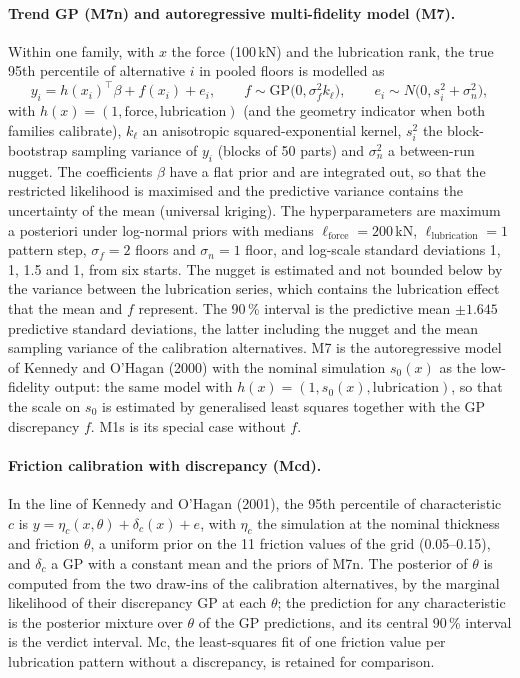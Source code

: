 \documentclass[pdflatex,sn-basic]{sn-jnl}
\begin{document}
\paragraph{Trend GP (M7n) and autoregressive multi-fidelity model (M7).} Within one family, with $x$ the force (100\,kN) and the lubrication rank, the true 95th percentile of alternative $i$ in pooled floors is modelled as
\begin{equation}
y_i = h(x_i)^\top\beta + f(x_i) + e_i,\qquad f\sim\mathrm{GP}\bigl(0, \sigma_f^2 k_\ell\bigr),\qquad e_i\sim N\bigl(0, s_i^2+\sigma_n^2\bigr),
\end{equation}
with $h(x)=(1, \text{force}, \text{lubrication})$ (and the geometry indicator when both families calibrate), $k_\ell$ an anisotropic squared-exponential kernel, $s_i^2$ the block-bootstrap sampling variance of $y_i$ (blocks of 50 parts) and $\sigma_n^2$ a between-run nugget. The coefficients $\beta$ have a flat prior and are integrated out, so that the restricted likelihood is maximised and the predictive variance contains the uncertainty of the mean (universal kriging). The hyperparameters are maximum a posteriori under log-normal priors with medians $\ell_\text{force}=200$\,kN, $\ell_\text{lubrication}=1$ pattern step, $\sigma_f=2$ floors and $\sigma_n=1$ floor, and log-scale standard deviations 1, 1, 1.5 and 1, from six starts. The nugget is estimated and not bounded below by the variance between the lubrication series, which contains the lubrication effect that the mean and $f$ represent. The 90\,\% interval is the predictive mean $\pm1.645$ predictive standard deviations, the latter including the nugget and the mean sampling variance of the calibration alternatives. M7 is the autoregressive model of Kennedy and O'Hagan (2000) with the nominal simulation $s_0(x)$ as the low-fidelity output: the same model with $h(x)=(1, s_0(x), \text{lubrication})$, so that the scale on $s_0$ is estimated by generalised least squares together with the GP discrepancy $f$. M1s is its special case without $f$.

\paragraph{Friction calibration with discrepancy (Mcd).} In the line of Kennedy and O'Hagan (2001), the 95th percentile of characteristic $c$ is $y=\eta_c(x,\theta)+\delta_c(x)+e$, with $\eta_c$ the simulation at the nominal thickness and friction $\theta$, a uniform prior on the 11 friction values of the grid (0.05--0.15), and $\delta_c$ a GP with a constant mean and the priors of M7n. The posterior of $\theta$ is computed from the two draw-ins of the calibration alternatives, by the marginal likelihood of their discrepancy GP at each $\theta$; the prediction for any characteristic is the posterior mixture over $\theta$ of the GP predictions, and its central 90\,\% interval is the verdict interval. Mc, the least-squares fit of one friction value per lubrication pattern without a discrepancy, is retained for comparison.
\end{document}
